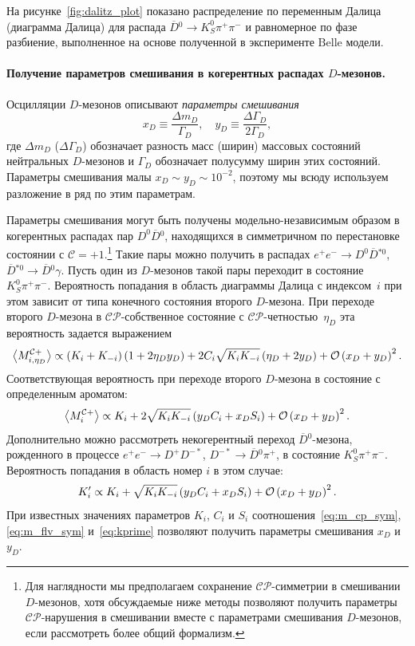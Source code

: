 \documentclass[a4paper,14pt]{extarticle} %
\newcommand{\dn}{\ensuremath{D^0}\xspace}
\newcommand{\dbar}{\ensuremath{\overline{D}}\xspace}
\newcommand{\dnbar}{\ensuremath{\dbar{}^0}\xspace}
\newcommand{\ks}{\ensuremath{K_S^0}\xspace}
\newcommand{\oxdydsq}{\ensuremath{\mco\left(x_D+y_D\right)^2}\xspace}
\newcommand{\lbr}{\ensuremath{\left(}}
\newcommand{\rbr}{\ensuremath{\right)}}
\newcommand{\kspp}{\ensuremath{\ks\pi^+\pi^-}\xspace}
\newcommand{\dbkpp}{\ensuremath{\dnbar\to\ks\pi^+\pi^-}\xspace}
\newcommand{\ep}{\ensuremath{e^+e^-}\xspace}
\newcommand{\mco}{\ensuremath{\mathcal{O}}\xspace}
\newcommand{\cpconj}{\ensuremath{\mathcal{CP}}\xspace}
\newcommand{\cconj}{\ensuremath{\mathcal{C}}\xspace}
\newcommand{\ki}{\ensuremath{K_i}\xspace}
\newcommand{\kmi}{\ensuremath{K_{-i}}\xspace}
\newcommand{\ci}{\ensuremath{C_i}\xspace}
\newcommand{\si}{\ensuremath{S_i}\xspace}
\newcommand{\belle}{\ensuremath{\mathrm{Belle}}\xspace}
\begin{document}
На рисунке~\ref{fig:dalitz_plot} показано распределение по переменным Далица (диаграмма Далица) для распада \dbkpp и равномерное по фазе разбиение, выполненное на основе полученной в эксперименте \belle модели.  

\paragraph{\boldmath Получение параметров смешивания в когерентных распадах $D$-мезонов.  }  Осцилляции $D$-мезонов описывают \emph{параметры смешивания}
\begin{equation}
 x_D \equiv \frac{\Delta m_D}{\Gamma_D},\quad y_D \equiv \frac{\Delta\Gamma_D}{2\Gamma_D},
\end{equation}
где $\Delta m_D$ ($\Delta\Gamma_D$) обозначает разность масс (ширин) массовых состояний нейтральных $D$-мезонов и $\Gamma_D$ обозначает полусумму ширин этих состояний.  Параметры смешивания малы $x_D\sim y_D\sim 10^{-2}$, поэтому мы всюду используем разложение в ряд по этим параметрам.

Параметры смешивания могут быть получены модельно-независимым образом в когерентных распадах пар $\dn\dnbar$, находящихся в симметричном по перестановке состоянии с $\cconj=+1$.\footnote{Для наглядности мы предполагаем сохранение \cpconj-симметрии в смешивании $D$-мезонов, хотя обсуждаемые ниже методы позволяют получить параметры \cpconj-нарушения в смешивании вместе с параметрами смешивания $D$-мезонов, если рассмотреть более общий формализм.}  Такие пары можно получить в распадах $\ep\to \dn\dbar{}^{*0}$, $\dbar{}^{*0}\to\dnbar\gamma$.  Пусть один из $D$-мезонов такой пары переходит в состояние~\kspp.  Вероятность попадания в область диаграммы Далица с индексом~$i$ при этом зависит от типа конечного состояния второго $D$-мезона.  При переходе второго $D$-мезона в \cpconj-собственное состояние с \cpconj-четностью~$\eta_D$ эта вероятность задается выражением
\begin{equation}\label{eq:m_cp_sym}
  \left<M^{\cconj+}_{i,\eta_D}\right> 
  \propto \lbr\ki+\kmi\rbr\lbr1 + 2\eta_D y_D\rbr + 2\ci\sqrt{\ki\kmi}\lbr\eta_D + 2y_D\rbr
  + \oxdydsq.
\end{equation}
Соответствующая вероятность при переходе второго $D$-мезона в состояние с определенным ароматом:
\begin{equation}\label{eq:m_flv_sym}
 \left<M^{\cconj+}_{i}\right> 
 \propto \ki + 2\sqrt{\ki\kmi}\lbr y_D\ci+x_D\si\rbr + \oxdydsq.
\end{equation}
Дополнительно можно рассмотреть некогерентный переход \dnbar-мезона, рожденного в процессе $\ep\to D^+D^{-*}$, $D^{-*}\to\dnbar\pi^+$, в состояние \kspp.  Вероятность попадания в область номер $i$ в этом случае:
\begin{equation}\label{eq:kprime}
 \ki^{\prime} \propto \ki + \sqrt{\ki\kmi}\lbr y_D\ci + x_D\si\rbr + \oxdydsq.
\end{equation}
При известных значениях параметров \ki, \ci и \si соотношения~\eqref{eq:m_cp_sym}, \eqref{eq:m_flv_sym} и~\eqref{eq:kprime} позволяют получить параметры смешивания $x_D$ и $y_D$.  
\end{document}
